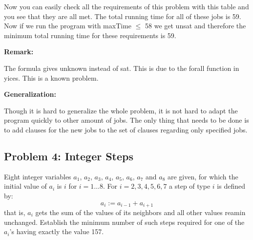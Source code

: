 \documentclass[12pt]{article}
\begin{document}
\vspace{3mm}

Now you can easily check all the requirements of this problem with this table and you see that they are all met. The total running time for all of these jobs is 59. Now if we run the program with maxTime $\leq$ 58 we get unsat and therefore the minimum total running time for these requirements is 59.

\vspace{3mm}

{\bf Remark:}

The formula gives unknown instead of sat. This is due to the forall function in yices. This is a known problem.\\

\vspace{3mm}

{\bf Generalization:}

Though it is hard to generalize the whole problem, it is not hard to adapt the program quickly to other amount of jobs. The only thing that needs to be done is to add clauses for the new jobs to the set of clauses regarding only specified jobs.\\

\vspace{3mm}

\subsection*{Problem 4: Integer Steps}

Eight integer variables $a_1$,  $a_2$,  $a_3$,  $a_4$,  $a_5$,  $a_6$,  $a_7$ and $a_8$ are given, for which the initial value of $a_i$ is $i$ for $i = 1 \ldots 8$. For $i = 2,3,4,5,6,7$ a step of type $i$ is defined by:
\[a_i := a_{i-1} + a_{i+1} \]
that is, $a_i$ gets the sum of the values of its neighbors and all other values reamin unchanged. Establish the minimum number of such steps required for one of the $a_{i}$'s having exactly the value 157.

\vspace{8mm}
\end{document}
